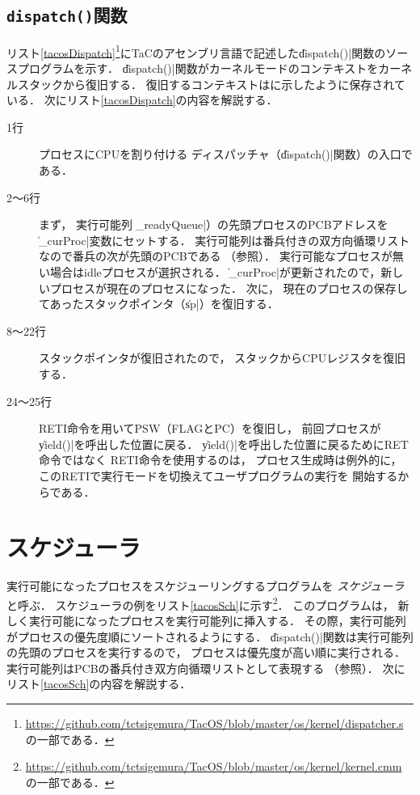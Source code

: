 \subsection{\texttt{dispatch()}関数}
リスト\ref{tacosDispatch}\footnote{
  \url{https://github.com/tctsigemura/TacOS/blob/master/os/kernel/dispatcher.s}
  の一部である．
}にTaCのアセンブリ言語で記述した\|dispatch()|関数のソースプログラムを示す．
\|dispatch()|関数がカーネルモードのコンテキストをカーネルスタックから復旧する．
復旧するコンテキストはに示したように保存されている．
次にリスト\ref{tacosDispatch}の内容を解説する．



\begin{description}
    \item[1行] プロセスにCPUを割り付ける
      ディスパッチャ（\|dispatch()|関数）の入口である．
    \item[2〜6行] まず，
      実行可能列（\|_readyQueue|）の先頭プロセスのPCBアドレスを
      \|_curProc|変数にセットする．
      実行可能列は番兵付きの双方向循環リストなので番兵の次が先頭のPCBである
      （参照）．
      実行可能なプロセスが無い場合はidleプロセスが選択される．
      \|_curProc|が更新されたので，新しいプロセスが現在のプロセスになった．
      次に，
      現在のプロセスの保存してあったスタックポインタ（\|sp|）を復旧する．
    \item[8〜22行] スタックポインタが復旧されたので，
      スタックからCPUレジスタを復旧する．
    \item[24〜25行] RETI命令を用いてPSW（FLAGとPC）を復旧し，
      前回プロセスが\|yield()|を呼出した位置に戻る．
      \|yield()|を呼出した位置に戻るためにRET命令ではなく
      RETI命令を使用するのは，
      プロセス生成時は例外的に，
      このRETIで実行モードを切換えてユーザプログラムの実行を
      開始するからである．
\end{description}

\section{スケジューラ}
\label{tacosScheduler}
実行可能になったプロセスをスケジューリングするプログラムを
\emph{スケジューラ}と呼ぶ．
スケジューラの例をリスト\ref{tacosSch}に示す\footnote{
  \url{https://github.com/tctsigemura/TacOS/blob/master/os/kernel/kernel.cmm}
  の一部である．}．
このプログラムは，
新しく実行可能になったプロセスを実行可能列に挿入する．
その際，実行可能列がプロセスの優先度順にソートされるようにする．
\|dispatch()|関数は実行可能列の先頭のプロセスを実行するので，
プロセスは優先度が高い順に実行される．
実行可能列はPCBの番兵付き双方向循環リストとして表現する
（参照）．
次にリスト\ref{tacosSch}の内容を解説する．

